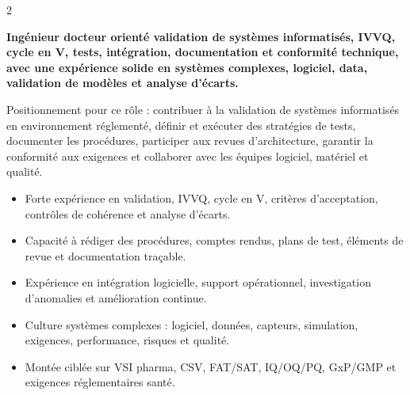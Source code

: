 \documentclass[8pt,a4paper,ragged2e,withhyper]{altacv}
\begin{document}
\begin{paracol}{2}
\switchcolumn


\textbf{Ingénieur docteur orienté validation de systèmes informatisés, IVVQ, cycle en V, tests, intégration, documentation et conformité technique, avec une expérience solide en systèmes complexes, logiciel, data, validation de modèles et analyse d’écarts.}

Positionnement pour ce rôle : contribuer à la validation de systèmes informatisés en environnement réglementé, définir et exécuter des stratégies de tests, documenter les procédures, participer aux revues d’architecture, garantir la conformité aux exigences et collaborer avec les équipes logiciel, matériel et qualité.

\begin{itemize}
  \item Forte expérience en validation, IVVQ, cycle en V, critères d’acceptation, contrôles de cohérence et analyse d’écarts.
  \item Capacité à rédiger des procédures, comptes rendus, plans de test, éléments de revue et documentation traçable.
  \item Expérience en intégration logicielle, support opérationnel, investigation d’anomalies et amélioration continue.
  \item Culture systèmes complexes : logiciel, données, capteurs, simulation, exigences, performance, risques et qualité.
  \item Montée ciblée sur VSI pharma, CSV, FAT/SAT, IQ/OQ/PQ, GxP/GMP et exigences réglementaires santé.
\end{itemize}


\divider
{}
\divider

\medskip



\divider


\divider


\divider



\end{paracol}
\end{document}
